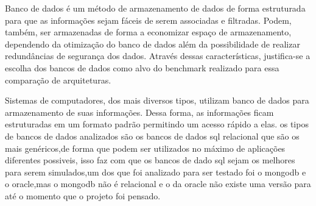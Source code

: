 \documentclass[
	12pt,				%
	openright,			%
	oneside,			%
	a4paper,			%
	english,			%
	french,				%
	spanish,			%
	brazil,				%
	]{abntex2}
\begin{document}
Banco de dados é um método de armazenamento de dados de forma estruturada para que as informações sejam fáceis de serem associadas e filtradas.
Podem, também, ser armazenadas de forma a economizar espaço de armazenamento, dependendo da otimização do banco de dados além da possibilidade de realizar redundâncias de segurança dos dados.
Através dessas características, justifica-se a escolha dos bancos de dados como alvo do benchmark realizado para essa comparação de arquiteturas.

Sistemas de computadores, dos mais diversos tipos, utilizam banco de dados para armazenamento de suas informações. Dessa forma, as informações ficam estruturadas em um formato padrão permitindo um acesso rápido a elas.
os tipos de bancos de dados analizados são os bancos de dados sql relacional que são os mais genéricos,de forma que podem ser utilizados no máximo de aplicações diferentes possiveis,
isso faz com que os bancos de dado sql sejam os melhores para serem simulados,um dos que foi analizado para ser testado foi o mongodb e o oracle,mas o mongodb não é relacional e o da oracle não existe uma versão para  até o momento que o projeto foi pensado.
\end{document}
